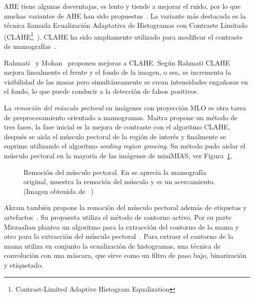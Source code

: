 AHE tiene algunas desventajas, es lento y tiende a mejorar el ruido, por lo que
muchas variantes de AHE han sido propuestas~\cite{pizer1987adaptive}. La
variante más destacada es la técnica llamada Ecualización Adaptativa de
Histogramas con Contraste Limitado (CLAHE\footnote{Contrast-Limited Adaptive
Histogram Equalization}~\cite{zuiderveld1994contrast}). CLAHE ha sido
ampliamente utilizado para modificar el contraste de
mamografías~\cite{pisano1998contrast, maitra2012technique}.

Rahmati~\cite{rahmati2010new} y Mohan~\cite{mohan2013modified} proponen mejoras
a CLAHE. Según Rahmati CLAHE mejora linealmente el frente y el fondo de la
imagen, o sea, se incrementa la visibilidad de las masas pero simultáneamente
se crean intensidades engañosas en el fondo, lo que puede conducir a la
detección de falsos positivos.

La \textit{remoción del músculo pectoral} en imágenes con proyección MLO es
otra tarea de preprocesamiento orientado a mamogramas. Maitra propone un método
de tres fases, la fase inicial es la mejora de contraste con el algoritmo
CLAHE, después se aisla el músculo pectoral de la región de interés y
finalmente se suprime utilizando el algoritmo \textit{seeding region growing}.
Su método pudo aislar el músculo pectoral en la mayoría de las imágenes de
miniMIAS, ver Figura~\ref{fig:muscle}.

\begin{figure}[h]
    \centering
    \hspace{1cm}
    \hspace{1cm}

  \caption[Remoción del músculo pectoral]
  {Remoción del músculo pectoral. En \protect{} se aprecia la
  mamografía original, \protect{} muestra la remoción del
  músculo y \protect{} es un acercamiento. (Imagen obtenida de
  ~\cite{maitra2012technique})}

  \label{fig:muscle}
\end{figure}

Akram también propone la remoción del músculo pectoral además de etiquetas y
artefactos~\cite{akram2013preprocessing}. Su propuesta utiliza el método de
contorno activo. Por su parte Mirzaalian plantea un algoritmo para la
extracción del contorno de la mama y otro para la extracción del músculo
pectoral~\cite{mirzaalian2007pre}. Para extraer el contorno de la mama utiliza
en conjunto la ecualización de histogramas, una técnica de convolución con una
máscara, que sirve como un filtro de paso bajo, binarización y etiquetado.

